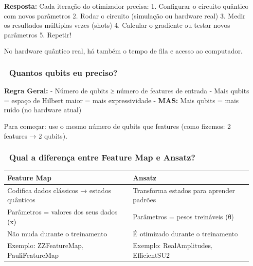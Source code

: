 \documentclass[
  brazilian,
]{report}
\newcounter{none} %
\begin{document}
\textbf{Resposta:} Cada iteração do otimizador precisa: 1. Configurar o
circuito quântico com novos parâmetros 2. Rodar o circuito (simulação ou
hardware real) 3. Medir os resultados múltiplas vezes (shots) 4.
Calcular o gradiente ou testar novos parâmetros 5. Repetir!

No hardware quântico real, há também o tempo de fila e acesso ao
computador.

\subsubsection{🎯 Quantos qubits eu
preciso?}\label{quantos-qubits-eu-preciso}

\textbf{Regra Geral:} - Número de qubits ≥ número de features de entrada
- Mais qubits = espaço de Hilbert maior = mais expressividade -
\textbf{MAS:} Mais qubits = mais ruído (no hardware atual)

Para começar: use o mesmo número de qubits que features (como fizemos: 2
features → 2 qubits).

\subsubsection{🔬 Qual a diferença entre Feature Map e
Ansatz?}\label{qual-a-diferenuxe7a-entre-feature-map-e-ansatz}

{\def\LTcaptype{none} %
\begin{longtable}[]{@{}
  >{\raggedright\arraybackslash}p{}
  >{\raggedright\arraybackslash}p{}@{}}
\toprule\noalign{}
\begin{minipage}[b]{\linewidth}\raggedright
\textbf{Feature Map}
\end{minipage} & \begin{minipage}[b]{\linewidth}\raggedright
\textbf{Ansatz}
\end{minipage} \\
\midrule\noalign{}
\endhead
\bottomrule\noalign{}
\endlastfoot
Codifica dados clássicos → estados quânticos & Transforma estados para
aprender padrões \\
Parâmetros = valores dos seus dados (x) & Parâmetros = pesos treináveis
(θ) \\
Não muda durante o treinamento & É otimizado durante o treinamento \\
Exemplo: ZZFeatureMap, PauliFeatureMap & Exemplo: RealAmplitudes,
EfficientSU2 \\
\end{longtable}
}
\end{document}
